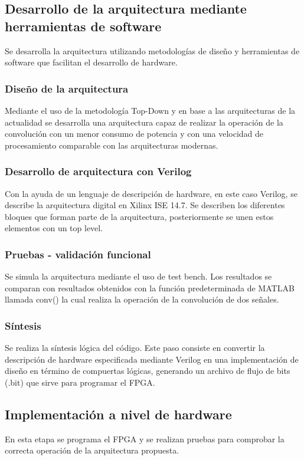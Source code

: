 \subsection{Desarrollo de la arquitectura mediante herramientas de software}
Se desarrolla la arquitectura utilizando metodologías de diseño y herramientas de software que facilitan el desarrollo de hardware. 

\subsubsection{Diseño de la arquitectura}
Mediante el uso de la metodología Top-Down y en base a las arquitecturas de la actualidad se desarrolla una arquitectura capaz de realizar la operación de la convolución con un menor consumo de potencia y con una velocidad de procesamiento comparable con las arquitecturas modernas.  

\subsubsection{Desarrollo de arquitectura con Verilog}
Con la ayuda de un lenguaje de descripción de hardware, en este caso Verilog, se describe la arquitectura digital en Xilinx ISE 14.7. Se describen los diferentes bloques que forman parte de la arquitectura, posteriormente se unen estos elementos con un top level. 

\subsubsection{Pruebas - validación funcional}
Se simula la arquitectura mediante el uso de test bench. Los resultados se comparan con resultados obtenidos con la función predeterminada de MATLAB llamada conv() la cual realiza la operación de la convolución de dos señales.

\subsubsection{Síntesis}
Se realiza la síntesis lógica del código. Este paso consiste en convertir la descripción de hardware especificada mediante Verilog en una implementación de diseño en término de compuertas lógicas, generando un archivo de flujo de bits (.bit) que sirve para programar el FPGA. 

\subsection{Implementación a nivel de hardware}
En esta etapa se programa el FPGA y se realizan pruebas para comprobar la correcta operación de la arquitectura propuesta. 

